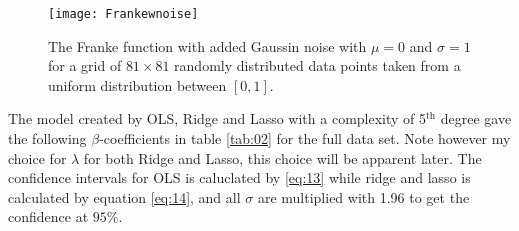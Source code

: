 \documentclass[uio,jmp,amsmath,amssymb,reprint,nofootinbib]{revtex4-1}
\numberwithin{equation}{section}
\begin{document}
\begin{figure}[H]
    \centering
    \texttt{[image: Frankewnoise]}
    \caption{The Franke function with added Gaussin noise with \(\mu=0\) and \(\sigma=1\) for a grid of \(81\times 81\) randomly distributed data points taken from a uniform distribution between \([0,1]\).}
    \label{fig:Franke_w_noise}
\end{figure}

The model created by OLS, Ridge and Lasso with a complexity of 5\(^\text{th}\) degree gave the following \(\beta\)-coefficients in table \ref{tab:02} for the full data set. Note however my choice for \(\lambda\) for both Ridge and Lasso, this choice will be apparent later. The confidence intervals for OLS is caluclated by \ref{eq:13} while ridge and lasso is calculated by equation \ref{eq:14}, and all \(\sigma\) are multiplied with 1.96 to get the confidence at \(95\%\).
\end{document}
